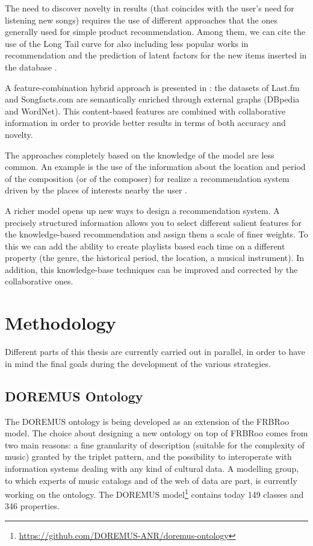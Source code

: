 \documentclass{llncs}
\begin{document}
The need to discover novelty in results (that coincides with the user's need for listening new songs) requires the use of different approaches that the ones generally used for simple product recommendation. Among them, we can cite the use of the Long Tail curve for also including less popular works in recommendation \cite{celma2009music} and the prediction of latent factors for the new items inserted in the database \cite{van2013deep}.

A feature-combination hybrid approach is presented in \cite{ostuni2015soundrec}: the datasets of Last.fm and Songfacts.com are semantically enriched through external graphs (DBpedia and WordNet). This content-based features are combined with collaborative information in order to provide better results in terms of both accuracy and novelty.

The approaches completely based on the knowledge of the model are less common. An example is the use of the information about the location and period of the composition (or of the composer) for realize a recommendation system driven by the places of interests nearby the user \cite{kaminskas2012knowledge}. 

A richer model opens up new ways to design a recommendation system. A precisely structured information allows you to select different salient features for the knowledge-based recommendation and assign them a scale of finer weights. To this we can add the ability to create playlists based each time on a different property (the genre, the historical period, the location, a musical instrument). In addition, this knowledge-base techniques can be improved and corrected by the collaborative ones.


\section{Methodology}
\label{sec:methodology}
Different parts of this thesis are currently carried out in parallel, in order to have in mind the final goals during the development of the various strategies.

\subsection{DOREMUS Ontology}
The DOREMUS ontology \cite{choffe2016doremus} is being developed as an extension of the FRBRoo model. The choice about designing a new ontology on top of FRBRoo comes from two main reasons: a fine granularity of description (suitable for  the complexity of music) granted by the triplet pattern, and the possibility to interoperate with information systems dealing with any kind of cultural data. A modelling group, to which experts of music catalogs and of the web of data are part, is currently working on the ontology. The DOREMUS model\footnote{\url{https://github.com/DOREMUS-ANR/doremus-ontology}} contains today 149 classes and 346 properties.
\end{document}
